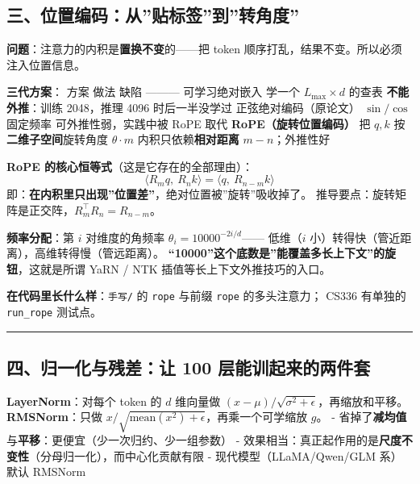 \documentclass[
  chinese,
  11pt,
]{ctexart}
\begin{document}
\subsection{三、位置编码：从''贴标签''到''转角度''}\label{ux4e09ux4f4dux7f6eux7f16ux7801ux4eceux8d34ux6807ux7b7eux5230ux8f6cux89d2ux5ea6}

\textbf{问题}：注意力的内积是\textbf{置换不变}的------把 token 顺序打乱，结果不变。所以必须注入位置信息。

\textbf{三代方案}： \textbar{} 方案 \textbar{} 做法 \textbar{} 缺陷 \textbar{} \textbar---\textbar---\textbar---\textbar{} \textbar{} 可学习绝对嵌入 \textbar{} 学一个 \(L_{\max}\times d\) 的查表 \textbar{} \textbf{不能外推}：训练 2048，推理 4096 时后一半没学过 \textbar{} \textbar{} 正弦绝对编码（原论文） \textbar{} \(\sin/\cos\) 固定频率 \textbar{} 可外推性弱，实践中被 RoPE 取代 \textbar{} \textbar{} \textbf{RoPE（旋转位置编码）} \textbar{} 把 \(q,k\) 按\textbf{二维子空间}旋转角度 \(\theta\cdot m\) \textbar{} 内积只依赖\textbf{相对距离} \(m-n\)；外推性好 \textbar{}

\textbf{RoPE 的核心恒等式}（这是它存在的全部理由）： \[\langle R_m q,\ R_n k\rangle = \langle q,\ R_{n-m} k\rangle\] 即：\textbf{在内积里只出现''位置差''}，绝对位置被''旋转''吸收掉了。 推导要点：旋转矩阵是正交阵，\(R_m^\top R_n = R_{n-m}\)。

\textbf{频率分配}：第 \(i\) 对维度的角频率 \(\theta_i = 10000^{-2i/d}\)------ 低维（\(i\) 小）转得快（管近距离），高维转得慢（管远距离）。 \textbf{``10000''这个底数是''能覆盖多长上下文''的旋钮}，这就是所谓 YaRN / NTK 插值等长上下文外推技巧的入口。

\textbf{在代码里长什么样}：\texttt{手写/} 的 \texttt{rope} 与前缀 \texttt{rope} 的多头注意力； CS336 有单独的 \texttt{run\_rope} 测试点。

\begin{center}\rule{0.5\linewidth}{0.5pt}\end{center}

\subsection{四、归一化与残差：让 100 层能训起来的两件套}\label{ux56dbux5f52ux4e00ux5316ux4e0eux6b8bux5deeux8ba9-100-ux5c42ux80fdux8badux8d77ux6765ux7684ux4e24ux4ef6ux5957}

\textbf{LayerNorm}：对每个 token 的 \(d\) 维向量做 \((x-\mu)/\sqrt{\sigma^2+\epsilon}\)，再缩放和平移。 \textbf{RMSNorm}：只做 \(x/\sqrt{\mathrm{mean}(x^2)+\epsilon}\)，再乘一个可学缩放 \(g\)。 - 省掉了\textbf{减均值}与\textbf{平移}：更便宜（少一次归约、少一组参数） - 效果相当：真正起作用的是\textbf{尺度不变性}（分母归一化），而中心化贡献有限 - 现代模型（LLaMA/Qwen/GLM 系）默认 RMSNorm
\end{document}
